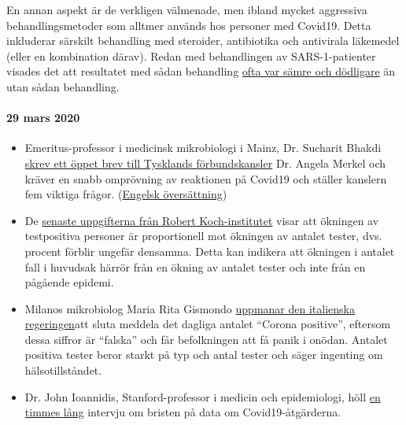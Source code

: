 En annan aspekt är de verkligen välmenade, men ibland mycket aggressiva
behandlingsmetoder som alltmer används hos personer med Covid19. Detta
inkluderar särskilt behandling med steroider, antibiotika och antivirala
läkemedel (eller en kombination därav). Redan med behandlingen av
SARS-1-patienter visades det att resultatet med sådan behandling
\href{https://www.sciencedaily.com/releases/2020/02/200206110703.htm}{ofta
var sämre och dödligare} än utan sådan behandling.

\hypertarget{29-mars-2020}{%
\paragraph{29 mars 2020}\label{29-mars-2020}}

\begin{itemize}
\tightlist
\item
  Emeritus-professor i medicinsk mikrobiologi i Mainz, Dr. Sucharit
  Bhakdi
  \href{https://swprs.org/offener-brief-von-professor-sucharit-bhakdi-an-bundeskanzlerin-dr-angela-merkel/}{skrev
  ett öppet brev till Tysklands förbundskansler} Dr. Angela Merkel och
  kräver en snabb omprövning av reaktionen på Covid19 och ställer
  kanslern fem viktiga frågor.
  (\href{https://swprs.org/open-letter-from-professor-sucharit-bhakdi-to-german-chancellor-dr-angela-merkel/}{Engelsk
  översättning})
\item
  De
  \href{https://multipolar-magazin.de/artikel/coronavirus-irrefuhrung-fallzahlen}{senaste
  uppgifterna från Robert Koch-institutet} visar att ökningen av
  testpositiva personer är proportionell mot ökningen av antalet tester,
  dvs. procent förblir ungefär densamma. Detta kan indikera att ökningen
  i antalet fall i huvudsak härrör från en ökning av antalet tester och
  inte från en pågående epidemi.
\item
  Milanos mikrobiolog Maria Rita Gismondo
  \href{https://www.secoloditalia.it/2020/03/coronavirus-la-gismondo-ammonisce-duramente-basta-snocciolare-numeri-sui-positivi-sono-dati-falsati/}{uppmanar
  den italienska regeringen}att sluta meddela det dagliga antalet
  ``Corona positive'', eftersom dessa siffror är ``falska'' och får
  befolkningen att få panik i onödan. Antalet positiva tester beror
  starkt på typ och antal tester och säger ingenting om
  hälsotillståndet.
\item
  Dr. John Ioannidis, Stanford-professor i medicin och epidemiologi,
  höll \href{https://www.youtube.com/watch?v=d6MZy-2fcBw}{en timmes
  lång} intervju om bristen på data om Covid19-åtgärderna.

\end{itemize}

